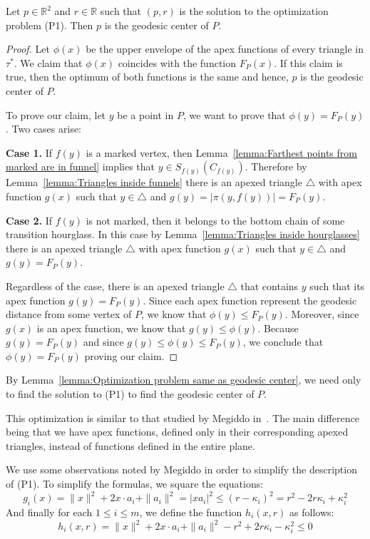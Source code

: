 \documentclass[a4paper,UKenglish]{lipics}
\newcommand{\F}[2]{\ensuremath{F_{\scriptscriptstyle #1}(#2)}}
\newcommand{\fn}[2]{\ensuremath{S_{\scriptscriptstyle #1}(#2)}}
\newcommand{\ff}[1]{\ensuremath{f(#1)}}
\newcommand{\g}[2]{\ensuremath{|\pi(#1, #2)|}}
\begin{document}
\begin{lemma}\label{lemma:Optimization problem same as geodesic center}
Let $p\in \mathbb{R}^2$ and $r\in \mathbb{R}$ such that $(p,r)$ is the solution to the optimization problem (P1). Then $p$ is the geodesic center of $P$.
\end{lemma}
\begin{proof}
Let $\phi(x)$ be the upper envelope of the apex functions of every triangle in $\tau^*$.
We claim that $\phi(x)$ coincides with the function $\F{P}{x}$.
If this claim is true, then the optimum of both functions is the same and hence, $p$ is the geodesic center of $P$.

To prove our claim, let $y$ be a point in $P$, we want to prove that $\phi(y) = \F{P}{y}$. 
Two cases arise: 

\textbf{Case 1.} If $\ff{y}$ is a marked vertex, then Lemma~\ref{lemma:Farthest points from marked are in funnel} implies that $y\in \fn{\ff{y}}{C_{\ff{y}}}$. Therefore
by Lemma~\ref{lemma:Triangles inside funnels} there is an apexed triangle $\triangle$ with apex function $g(x)$ such that $y\in \triangle$ and $g(y) = \g{y}{\ff{y}} = \F{P}{y}$.

\textbf{Case 2.} If $\ff{y}$ is not marked, then it belongs to the bottom chain of some transition hourglass. In this case by Lemma~\ref{lemma:Triangles inside hourglasses} there is an apexed triangle $\triangle$ with apex function $g(x)$ such that $y\in \triangle$ and $g(y) = \F{P}{y}$.

Regardless of the case, there is an apexed triangle $\triangle$ that contains $y$ such that its apex function $g(y) = \F{P}{y}$.
Since each apex function represent the geodesic distance from some vertex of $P$, we know that $\phi(y) \leq \F{P}{y}$. Moreover, since $g(x)$ is an apex function, we know that $g(y) \leq \phi(y)$.
Because $g(y) = \F{P}{y}$ and since $g(y) \leq \phi(y) \leq  \F{P}{y}$, we conclude that $\phi(y) = \F{P}{y}$ proving our claim.
\end{proof}

By Lemma~\ref{lemma:Optimization problem same as geodesic center}, we need only to find the solution to (P1) to find the geodesic center of $P$.

This optimization is similar to that studied by Megiddo in~\cite{megiddo1989ball}. 
The main difference being that we have apex functions, defined only in their corresponding apexed triangles, instead of functions defined in the entire plane. 

We use some observations noted by Megiddo in order to simplify the description of (P1).
To simplify the formulas, we square the equations:
$$g_i(x) = \|x\|^2 + 2x\cdot a_i + \|a_i\|^2  = |x a_i|^2 \leq (r - \kappa_i)^2 = r^2 - 2r\kappa_i + \kappa_i^2$$ 
And finally for each $1\leq i\leq m$, we define the function $h_i(x, r)$ as follows:
$$h_i(x, r) = \|x\|^2 + 2x\cdot a_i + \|a_i\|^2  - r^2 + 2r\kappa_i - \kappa_i^2 \leq 0$$
\end{document}
